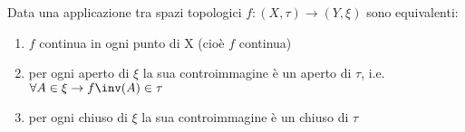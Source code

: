 \documentclass[a4paper]{article}
\begin{document}
\begin{prop}
Data una applicazione tra spazi topologici $f:(X,\tau) \to (Y,\xi )$ sono equivalenti:
\begin{enumerate}
	\item $f$ continua in ogni punto di X (cioè $f$ continua)
	\item per ogni aperto di $\xi$ la sua controimmagine è un aperto di $\tau $, i.e. $\forall A \in \xi \to f\inv (A) \in \tau $
	\item per ogni chiuso di $\xi$ la sua controimmagine è un chiuso di $\tau $
\end{enumerate}



\begin{tikzpicture}[x=0.75pt,y=0.75pt,yscale=-1,xscale=1]


\end{tikzpicture}
\end{prop}
\end{document}
